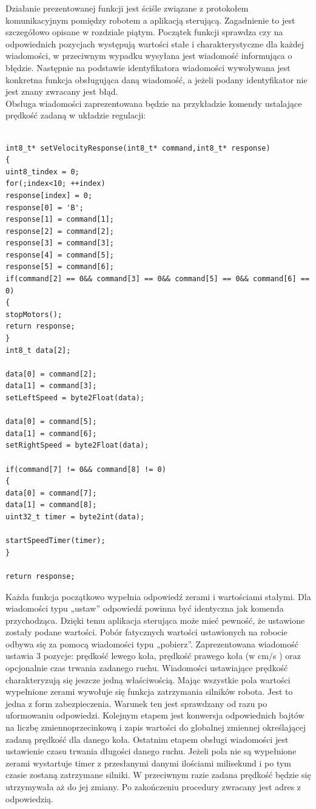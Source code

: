 \documentclass[eng,printmode]{mgr}
\begin{document}
Działanie prezentowanej funkcji jest ściśle związane z protokołem komunikacyjnym pomiędzy robotem a aplikacją sterującą. Zagadnienie to jest szczegółowo opisane w rozdziale piątym. Początek funkcji sprawdza czy na odpowiednich pozycjach występują wartości stałe i charakterystyczne dla każdej wiadomości, w przeciwnym wypadku wysyłana jest wiadomość informująca o błędzie. Następnie na podstawie identyfikatora wiadomości wywoływana jest konkretna funkcja obsługująca daną wiadomość, a jeżeli podany identyfikator nie jest znany zwracany jest błąd. 
\\Obsługa wiadomości zaprezentowana będzie na przykładzie komendy ustalające prędkość zadaną  w układzie regulacji:
\begin{lstlisting}[style=c]

int8_t* setVelocityResponse(int8_t* command,int8_t* response)
{
uint8_tindex = 0;
for(;index<10; ++index)
response[index] = 0;
response[0] = 'B';
response[1] = command[1];
response[2] = command[2];
response[3] = command[3];
response[4] = command[5];
response[5] = command[6];
if(command[2] == 0&& command[3] == 0&& command[5] == 0&& command[6] == 0)
{
stopMotors();
return response;
}
int8_t data[2];

data[0] = command[2];
data[1] = command[3];
setLeftSpeed = byte2Float(data);

data[0] = command[5];
data[1] = command[6];
setRightSpeed = byte2Float(data);

if(command[7] != 0&& command[8] != 0)
{
data[0] = command[7];
data[1] = command[8];
uint32_t timer = byte2int(data);

startSpeedTimer(timer);
}

return response;
\end{lstlisting}


Każda funkcja początkowo wypełnia odpowiedź zerami i wartościami stałymi. Dla wiadomości typu „ustaw” odpowiedź powinna być identyczna jak komenda przychodząca. Dzięki temu aplikacja sterująca może mieć pewność, że ustawione zostały podane wartości. Pobór fatycznych wartości ustawionych na robocie odbywa się za pomocą wiadomości typu „pobierz”.  Zaprezentowana wiadomość ustawia 3 pozycje: prędkość lewego koła, prędkość prawego koła (w cm/s ) oraz opcjonalnie czas trwania zadanego ruchu. Wiadomości ustawiające prędkość charakteryzują się jeszcze jedną właściwością. Mając wszystkie pola wartości  wypełnione zerami wywołuje się funkcja zatrzymania silników robota. Jest to jedna z form zabezpieczenia. Warunek ten jest sprawdzany od razu po uformowaniu odpowiedzi. Kolejnym etapem jest konwersja odpowiednich bajtów na liczbę zmiennoprzecinkową i zapis wartości do globalnej zmiennej określającej zadaną prędkość dla danego koła. Ostatnim etapem obsługi wiadomości jest ustawienie czasu trwania długości danego ruchu. Jeżeli pola nie są wypełnione zerami wystartuje timer z przesłanymi danymi ilościami milisekund i po tym czasie zostaną zatrzymane silniki. W przeciwnym razie zadana prędkość będzie się utrzymywała aż do jej zmiany. Po zakończeniu procedury zwracany jest adres z odpowiedzią.
\end{document}
